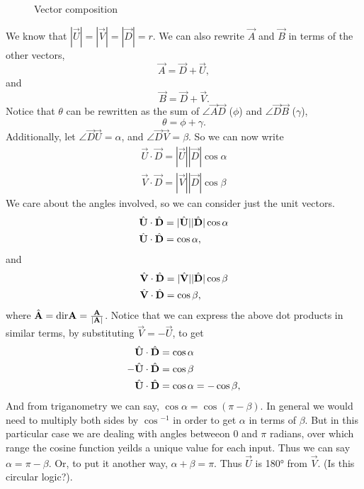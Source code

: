 \documentclass[main.tex]{subfiles}
\begin{document}
{\begin{figure}[h]
    \caption{Vector composition}
\end{figure}


We know that $|\vec{U}| = |\vec{V}| = |\vec{D}| = r$.
We can also rewrite $\vec{A}$ and $\vec{B}$ in terms of the other vectors,
\[\vec{A} = \vec{D} + \vec{U},\] and \[\vec{B} = \vec{D} + \vec{V}.\]
%
Notice that $\theta$ can be rewritten as the sum of 
$\angle{\vec{A}\vec{D}}$ ($\phi$) and $\angle{\vec{D}\vec{B}}$ ($\gamma$),
\[\theta = \phi + \gamma.\] Additionally, let $\angle{\vec{D}\vec{U}} = \alpha$,
and $\angle{\vec{D}\vec{V}} = \beta$. So we can now
write
%
\begin{align*}
\vec{U}\cdot\vec{D} = |\vec{U}||\vec{D}|\cos{\alpha}\\
\vec{V}\cdot\vec{D} = |\vec{V}||\vec{D}|\cos{\beta}
\end{align*}
%
We care about the angles involved, so we can consider just the unit vectors.
%
\begin{align*}
\hat{\mathbf{U}}\cdot\hat{\mathbf{D}} &= |\hat{\mathbf{U}}||\hat{\mathbf{D}}|\cos{\alpha}\\
\hat{\mathbf{U}}\cdot\hat{\mathbf{D}} &= \cos{\alpha},
\end{align*}
and
\begin{align*}
\hat{\mathbf{V}}\cdot\hat{\mathbf{D}} &= |\hat{\mathbf{V}}||\hat{\mathbf{D}}|\cos{\beta}\\
\hat{\mathbf{V}}\cdot\hat{\mathbf{D}} &= \cos{\beta},
\end{align*}
%
where $\hat{\mathbf{A}} = \text{dir}\mathbf{A} =\frac{\mathbf{A}}{|\mathbf{A}|}$. 
Notice that we can express the above dot products in similar terms,
by substituting $\vec{V} = -\vec{U}$, to get
%
\begin{align*}
\hat{\mathbf{U}}\cdot\hat{\mathbf{D}} &= \cos{\alpha}\\
-\hat{\mathbf{U}}\cdot\hat{\mathbf{D}} &= \cos{\beta}\\
\hat{\mathbf{U}}\cdot\hat{\mathbf{D}} &= \cos{\alpha} = -\cos{\beta},
\end{align*}
%
And from triganometry we can say, $\cos{\alpha} = \cos{(\pi-\beta)}$.
In general we would need to multiply both sides by $\cos{}^{-1}$ in order to get
$\alpha$ in terms of $\beta$. But in this particular case we are dealing with
angles betweeon $0$ and $\pi$ radians, over which range the cosine function 
yeilds a unique value for each input. Thus we can say $\alpha = \pi-\beta$.
Or, to put it another way, $\alpha + \beta = \pi$. Thus $\vec{U}$ is \ang{180}
from $\vec{V}$. (Is this circular logic?).



}
\end{document}
